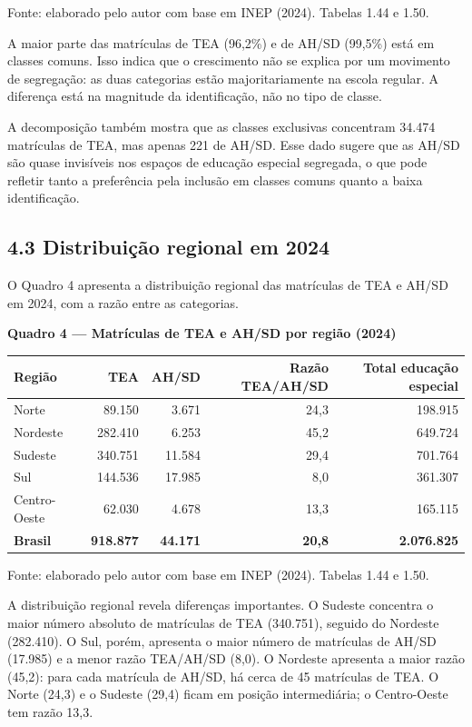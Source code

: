 \endgroup

Fonte: elaborado pelo autor com base em INEP (2024). Tabelas 1.44 e
1.50.

A maior parte das matrículas de TEA (96,2\%) e de AH/SD (99,5\%) está em
classes comuns. Isso indica que o crescimento não se explica por um
movimento de segregação: as duas categorias estão majoritariamente na
escola regular. A diferença está na magnitude da identificação, não no
tipo de classe.

A decomposição também mostra que as classes exclusivas concentram 34.474
matrículas de TEA, mas apenas 221 de AH/SD. Esse dado sugere que as
AH/SD são quase invisíveis nos espaços de educação especial segregada, o
que pode refletir tanto a preferência pela inclusão em classes comuns
quanto a baixa identificação.

\subsection{4.3 Distribuição regional em
2024}\label{distribuiuxe7uxe3o-regional-em-2024}

O Quadro 4 apresenta a distribuição regional das matrículas de TEA e
AH/SD em 2024, com a razão entre as categorias.

\textbf{Quadro 4 --- Matrículas de TEA e AH/SD por região (2024)}

\begingroup\small

\begin{longtable}[]{@{}lrrrr@{}}
\toprule\noalign{}
Região & TEA & AH/SD & Razão TEA/AH/SD & Total educação especial \\
\midrule\noalign{}
\endhead
\bottomrule\noalign{}
\endlastfoot
Norte & 89.150 & 3.671 & 24,3 & 198.915 \\
Nordeste & 282.410 & 6.253 & 45,2 & 649.724 \\
Sudeste & 340.751 & 11.584 & 29,4 & 701.764 \\
Sul & 144.536 & 17.985 & 8,0 & 361.307 \\
Centro-Oeste & 62.030 & 4.678 & 13,3 & 165.115 \\
\textbf{Brasil} & \textbf{918.877} & \textbf{44.171} & \textbf{20,8} &
\textbf{2.076.825} \\
\end{longtable}

\endgroup

Fonte: elaborado pelo autor com base em INEP (2024). Tabelas 1.44 e
1.50.

A distribuição regional revela diferenças importantes. O Sudeste
concentra o maior número absoluto de matrículas de TEA (340.751),
seguido do Nordeste (282.410). O Sul, porém, apresenta o maior número de
matrículas de AH/SD (17.985) e a menor razão TEA/AH/SD (8,0). O Nordeste
apresenta a maior razão (45,2): para cada matrícula de AH/SD, há cerca
de 45 matrículas de TEA. O Norte (24,3) e o Sudeste (29,4) ficam em
posição intermediária; o Centro-Oeste tem razão 13,3.

